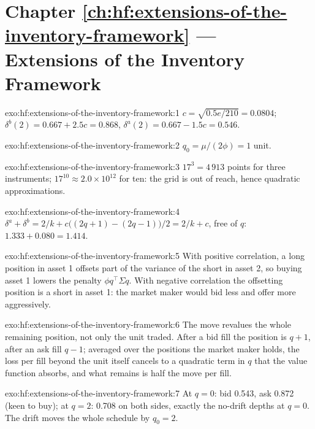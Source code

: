 \section*{Chapter \ref{ch:hf:extensions-of-the-inventory-framework} --- Extensions of the Inventory Framework}

\begin{solution}{exo:hf:extensions-of-the-inventory-framework:1}
$c=\sqrt{0.5e/210}=0.0804$; $\delta^b(2)=0.667+2.5c=0.868$, $\delta^a(2)=0.667-1.5c=0.546$.
\end{solution}

\begin{solution}{exo:hf:extensions-of-the-inventory-framework:2}
$q_0=\mu/(2\phi)=1$ unit.
\end{solution}

\begin{solution}{exo:hf:extensions-of-the-inventory-framework:3}
$17^3=4\,913$ points for three instruments; $17^{10}\approx2.0\times10^{12}$ for ten: the grid is out of reach, hence quadratic approximations.
\end{solution}

\begin{solution}{exo:hf:extensions-of-the-inventory-framework:4}
$\delta^a+\delta^b=2/k+c\bigl((2q+1)-(2q-1)\bigr)/2=2/k+c$, free of $q$: $1.333+0.080=1.414$.
\end{solution}

\begin{solution}{exo:hf:extensions-of-the-inventory-framework:5}
With positive correlation, a long position in asset 1 offsets part of the variance of the short in asset 2, so buying asset 1 lowers the penalty
$\phi q^\top\Sigma q$. With negative correlation the offsetting position is a short in asset 1: the market maker would bid less and offer more
aggressively.
\end{solution}

\begin{solution}{exo:hf:extensions-of-the-inventory-framework:6}
The move revalues the whole remaining position, not only the unit traded. After a bid fill the position is $q+1$, after an ask fill $q-1$; averaged
over the positions the market maker holds, the loss per fill beyond the unit itself cancels to a quadratic term in $q$ that the value function
absorbs, and what remains is half the move per fill.
\end{solution}

\begin{solution}{exo:hf:extensions-of-the-inventory-framework:7}
At $q=0$: bid 0.543, ask 0.872 (keen to buy); at $q=2$: 0.708 on both sides, exactly the no-drift depths at $q=0$. The drift moves the whole
schedule by $q_0=2$.
\end{solution}

